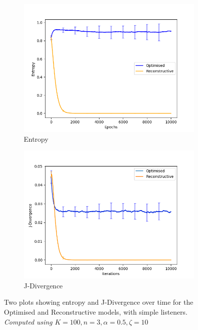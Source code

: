

\begin{figure}[H]
 \centering
  \begin{subfigure}[ht]{0.45\textwidth}
    \includegraphics[width=\textwidth]{Images/Figures/Reconstructive/Entropy_reconstruct.png}
    \caption{Entropy}
 \end{subfigure}
 \hfill
 \begin{subfigure}[ht]{0.45\textwidth}
    \includegraphics[width=\textwidth]{Images/Figures/Reconstructive/J-Div_reconstruct.png}
    \caption{J-Divergence}
 \end{subfigure}
 \caption{Two plots showing entropy and J-Divergence over time for the Optimised and Reconstructive models, with simple listeners. \textit{Computed using $K = 100, n=3, \alpha = 0.5, \zeta = 10$}}\label{fig:reconstructive}
\end{figure}



